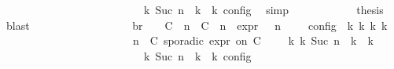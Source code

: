 \begin{isabellebody}
\ \ \ \ \ \ \ \ \ \ \ \ \ \ \ \ \ \ \ \ \ \ {\isasymand}\ {\isasymrho}\ {\isasymin}\ {\isasymlbrakk}\ {\isasymGamma}\isactrlsub k{\isacharcomma}\ Suc\ n\ {\isasymturnstile}\ {\isasymPsi}\isactrlsub k\ {\isasymtriangleright}\ {\isasymPhi}\isactrlsub k\ {\isasymrbrakk}\isactrlsub c\isactrlsub o\isactrlsub n\isactrlsub f\isactrlsub i\isactrlsub g{\isacartoucheclose}\ \isamarkupfalse%
\ simp\isanewline
\ \ \ \ \ \ \ \ \ \ \isamarkupfalse%
\ {\isacharquery}thesis\ \isamarkupfalse%
\ blast\isanewline
\ \ \ \ \ \ \ \ \isamarkupfalse%
\isanewline
\ \ \ \ \ \ \isamarkupfalse%
\ \isamarkupfalse%
\ br{}{\isacharcolon}\ {\isacartoucheopen}{\isasymrho}\ {\isasymin}\ {\isasymlbrakk}\ {\isacharparenleft}{\isacharparenleft}C\ {\isasymUp}\ n{\isacharparenright}\ {\isacharhash}\ {\isacharparenleft}C\ {\isasymDown}\ n\ {\isacharat}{\isasymsharp}\ {\isasymtau}\isactrlsub e\isactrlsub x\isactrlsub p\isactrlsub r{\isacharparenright}\ {\isacharhash}\ {\isasymGamma}{\isacharparenright}{\isacharcomma}\ n\ {\isasymturnstile}\ {\isasymPsi}\ {\isasymtriangleright}\ {\isasymPhi}\ {\isasymrbrakk}\isactrlsub c\isactrlsub o\isactrlsub n\isactrlsub f\isactrlsub i\isactrlsub g\ {\isasymLongrightarrow}\ {\isasymexists}{\isasymGamma}\isactrlsub k\ {\isasymPsi}\isactrlsub k\ {\isasymPhi}\isactrlsub k\ k{\isachardot}\isanewline
\ \ \ \ \ \ \ \ \ \ \ \ \ \ \ \ \ \ \ \ \ \ \ {\isacharparenleft}{\isacharparenleft}{\isasymGamma}{\isacharcomma}\ n\ {\isasymturnstile}\ {\isacharparenleft}{\isacharparenleft}C\ sporadic{\isasymsharp}\ {\isasymtau}\isactrlsub e\isactrlsub x\isactrlsub p\isactrlsub r\ on\ C\ {\isacharhash}\ {\isasymPsi}{\isacharparenright}\ {\isasymtriangleright}\ {\isasymPhi}{\isacharparenright}\ {\isasymhookrightarrow}\isactrlbsup k\isactrlesup \ {\isacharparenleft}{\isasymGamma}\isactrlsub k{\isacharcomma}\ Suc\ n\ {\isasymturnstile}\ {\isasymPsi}\isactrlsub k\ {\isasymtriangleright}\ {\isasymPhi}\isactrlsub k{\isacharparenright}{\isacharparenright}\isanewline
\ \ \ \ \ \ \ \ \ \ \ \ \ \ \ \ \ \ \ \ \ \ {\isasymand}\ {\isasymrho}\ {\isasymin}\ {\isasymlbrakk}\ {\isasymGamma}\isactrlsub k{\isacharcomma}\ Suc\ n\ {\isasymturnstile}\ {\isasymPsi}\isactrlsub k\ {\isasymtriangleright}\ {\isasymPhi}\isactrlsub k\ {\isasymrbrakk}\isactrlsub c\isactrlsub o\isactrlsub n\isactrlsub f\isactrlsub i\isactrlsub g{\isacartoucheclose}\isanewline
\ \ \ \ \ \ \ \ \isamarkupfalse%

\end{isabellebody}
